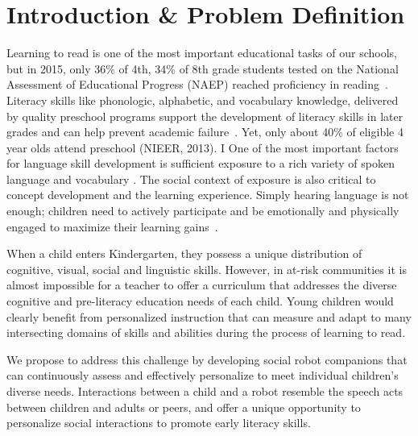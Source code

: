 
\vspace{-4mm}   
\section{Introduction \& Problem Definition}
 \vspace{-3mm}   
Learning to read is one of the most important educational tasks of our schools, but in 2015, only 36\% of 4th, 34\% of 8th grade students tested on the National Assessment of Educational Progress (NAEP) reached proficiency in reading~\cite{nces2015}. Literacy skills like phonologic, alphabetic, and vocabulary knowledge, delivered by quality preschool programs support the development of literacy skills in later grades and can help prevent academic failure~\cite{hart1995meaningful,paez2007dual}. Yet, only about 40\% of eligible 4 year olds attend preschool (NIEER, 2013).
I 
One of the most important factors for language skill development is sufficient exposure to a rich variety of spoken language and vocabulary \cite{asaridou2016pace}. The social context of exposure is also critical to concept development and the learning experience. Simply hearing language is not enough; children need to actively participate and be emotionally and physically engaged to maximize their learning gains~\cite{wells2000dialogic}. 

When a child enters Kindergarten, they possess a unique distribution of cognitive, visual, social and linguistic skills. However, in at-risk communities it is almost impossible for a teacher to offer a curriculum that addresses the diverse cognitive and pre-literacy education needs of each child. Young children would clearly benefit from personalized instruction that can measure and adapt to many intersecting domains of skills and abilities during the process of learning to read. 

We propose to address this challenge by developing social robot companions that can continuously assess and effectively personalize to meet individual children's diverse needs. Interactions between a child and a robot resemble the speech acts between children and adults or peers, and offer a unique opportunity to personalize social interactions to promote early literacy skills.

\vspace{-4mm}   

